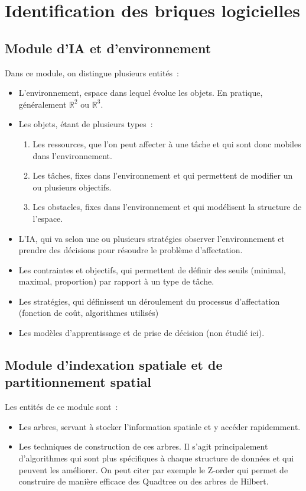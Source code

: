 \section{Identification des briques logicielles}

%
\subsection{Module d'IA et d'environnement}

Dans ce module, on distingue plusieurs entités~:
\begin{itemize}
\setlength{\itemsep}{5pt}
\item L'environnement, espace dans lequel évolue les objets. En pratique, généralement $\mathbb{R}^2$ ou $\mathbb{R}^3$.
\item Les objets, étant de plusieurs types~:
	\begin{enumerate}
	\item Les ressources, que l'on peut affecter à une tâche et qui sont donc mobiles dans l'environnement.
	\item Les tâches, fixes dans l'environnement et qui permettent de modifier un ou plusieurs objectifs.
	\item Les obstacles, fixes dans l'environnement et qui modélisent la structure de l'espace.
	\end{enumerate}
\item L'IA, qui va selon une ou plusieurs stratégies observer l'environnement et prendre des décisions pour résoudre le problème d'affectation.
\item Les contraintes et objectifs, qui permettent de définir des seuils (minimal, maximal, proportion) par rapport à un type de tâche.
\item Les stratégies, qui définissent un déroulement du processus d'affectation (fonction de coût, algorithmes utilisés)
\item Les modèles d'apprentissage et de prise de décision (non étudié ici).
\end{itemize} %

%
\subsection{Module d'indexation spatiale et de partitionnement spatial}

Les entités de ce module sont~:
\begin{itemize}
\setlength{\itemsep}{5pt}
\item Les arbres, servant à stocker l'information spatiale et y accéder rapidemment.
\item Les techniques de construction de ces arbres. Il s'agit principalement d'algorithmes qui sont plus spécifiques à chaque structure de données et qui peuvent les améliorer. On peut citer par exemple le Z-order qui permet de construire de manière efficace des Quadtree ou des arbres de Hilbert.
\end{itemize}

